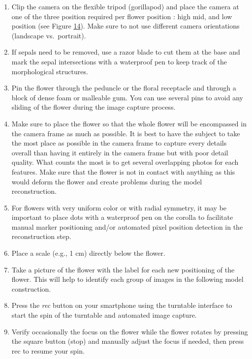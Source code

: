 \documentclass[
]{book}
\begin{document}
\begin{enumerate}
\def\labelenumi{\arabic{enumi}.}
\item
  Clip the camera on the flexible tripod (gorillapod) and place the
  camera at one of the three position required per flower position :
  high mid, and low position (see Figure
  \protect\hyperlink{flowerplacement_2}{14}). Make sure to not use different
  camera orientations (landscape vs.~portrait).
\item
  If sepals need to be removed, use a razor blade to cut them at the
  base and mark the sepal intersections with a waterproof pen to keep
  track of the morphological structures.
\item
  Pin the flower through the peduncle or the floral receptacle and
  through a block of dense foam or malleable gum. You can use several
  pins to avoid any sliding of the flower during the image capture
  process.
\item
  Make sure to place the flower so that the whole flower will be
  encompassed in the camera frame as much as possible. It is best to
  have the subject to take the most place as possible in the camera
  frame to capture every details overall than having it entirely in
  the camera frame but with poor detail quality. What counts the most
  is to get several overlapping photos for each features. Make sure
  that the flower is not in contact with anything as this would deform
  the flower and create problems during the model reconstruction.
\item
  For flowers with very uniform color or with radial symmetry, it may
  be important to place dots with a waterproof pen on the corolla to
  facilitate manual marker positioning and/or automated pixel position
  detection in the reconstruction step.
\item
  Place a scale (e.g., 1 cm) directly below the flower.
\item
  Take a picture of the flower with the label for each new positioning
  of the flower. This will help to identify each group of images in
  the following model construction.
\item
  Press the \emph{rec} button on your smartphone using the turntable
  interface to start the spin of the turntable and automated image
  capture.
\item
  Verify occasionally the focus on the flower while the flower rotates
  by pressing the square button (stop) and manually adjust the focus
  if needed, then press rec to resume your spin.
\end{enumerate}
\end{document}
